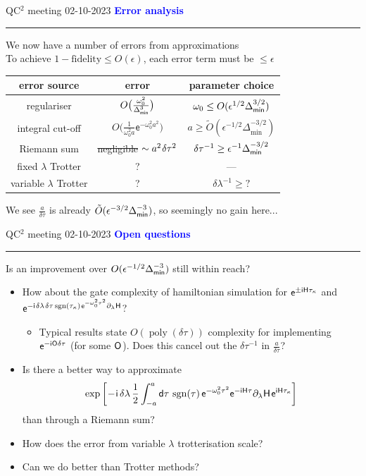 \documentclass{beamer}
\def\lbt{\small QC$^2$ meeting 02-10-2023} %
\DeclareMathOperator{\sgn}{sgn}
\DeclareMathOperator{\poly}{poly}
\def\mt#1{\kern0.025em\mathsf{#1}\kern0.025em}
\def\d{\mathsf d}
\def\e{\mathsf e}
\def\i{\mathsf i}
\def\H{\mt H}
\def\+{\kern0.0833em}
\newenvironment{dia}[2]
{
	\begin{frame}
	\vspace{1mm}
	{\small #1}
	\hfill
    {\small\bf\textcolor{blue}{#2}}
	\vspace{3mm}
	\hrule
	\bigskip
}
{
	\vfill
	\end{frame}
}
\begin{document}
\begin{dia}{\lbt}{Error analysis}
We now have a number of errors from approximations \pause \\[4mm]
To achieve $1 - \text{fidelity} \leq O(\epsilon)$, each error term must be $\leq \epsilon$ \pause
\begin{center}
    \renewcommand{\arraystretch}{1.2}
    \begin{tabular}{c|c|c}
        error source & error & parameter choice \\ \hline
        regulariser & $O\big(\frac{\omega_0^2}{\Delta_{\sf min}^3}\big)$ & $\omega_0 \leq O(\epsilon^{1/2}\Delta_{\sf min}^{3/2})$ \pause \\
        integral cut-off & $O\big(\frac1{\omega_0^2 a} \e^{-\omega_0^2 a^2}\big)$ & $a \geq \tilde O(\epsilon^{-1/2}\Delta_{\min}^{-3/2})$ \pause \\
        Riemann sum & \sout{negligible} $\sim a^2 \+ \delta\tau^2$ & $\delta\tau^{-1} \geq \epsilon^{-1}\Delta_{\sf min}^{-3/2}$ \pause \\
        fixed $\lambda$ Trotter & ? & --- \\
        variable $\lambda$ Trotter & ? & $\delta\lambda^{-1} \geq {?}$ \pause
    \end{tabular}
\end{center}
We see $\displaystyle \frac a{\delta\tau}$ is already $\tilde O(\epsilon^{-3/2}\Delta_{\sf min}^{-3})$, so seemingly no gain here...
\vspace{-1cm}
\end{dia}

\begin{dia}{\lbt}{Open questions}
Is an improvement over $O(\epsilon^{-1/2}\Delta_{\sf min}^{-3})$ still within reach? \pause
\begin{itemize}
    \item How about the gate complexity of hamiltonian simulation for $\e^{\pm\i\H\tau_\kappa}$ and $\e^{-\i \+ \delta\lambda \+ \delta\tau \sgn(\tau_\kappa) \+ \e^{-\omega_0^2\tau^2} \partial_\lambda \H}$? \pause
    \begin{itemize}
        \item Typical results state $O(\poly(\delta\tau))$ complexity for implementing $\e^{-\i \mt O \delta\tau}$ (for some $\mt O$). Does this cancel out the $\delta\tau^{-1}$ in $\frac a{\delta\tau}$? \pause
    \end{itemize}
    \item Is there a better way to approximate
    \begin{align*}
        \exp\bigg[ \! -\!\i \, \delta\lambda \, \frac12 \int_{-a}^a \d\tau \, \sgn(\tau) \, \e^{-\omega_0^2\tau^2} \e^{-\i\H\tau} \partial_\lambda \H \+ \e^{\i\H\tau_\kappa} \bigg]
    \end{align*}
    than through a Riemann sum? \pause
    \item How does the error from variable $\lambda$ trotterisation scale? \pause
    \item Can we do better than Trotter methods?
\end{itemize}
\vspace{-1cm}
\end{dia}
\end{document}
